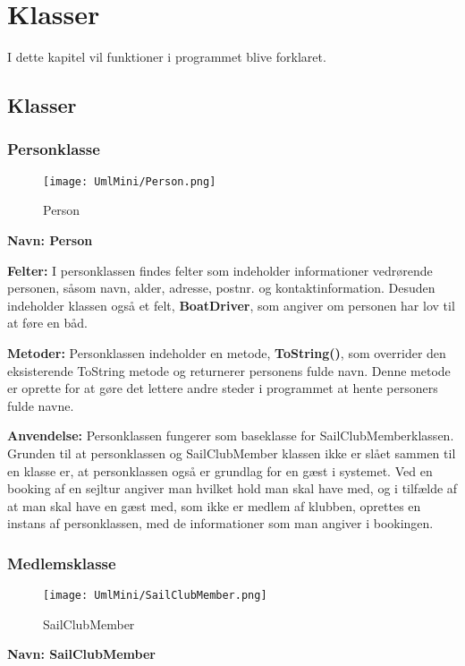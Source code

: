 \chapter{Klasser} \label{chap:klasser}
I dette kapitel vil funktioner i programmet blive forklaret.

\section{Klasser}
\subsection*{Personklasse}
\begin{wrapfigure}[9]{R}{0.25\textwidth}
    \label{img:Person}
    \vspace{-20pt}
    \begin{center}
        \texttt{[image: UmlMini/Person.png]}
    \end{center}
    \vspace{-10pt}
    \caption{Person}
\end{wrapfigure}
\textbf{Navn: Person}

\textbf{Felter:}
I personklassen findes felter som indeholder informationer vedrørende personen, såsom navn, alder, adresse, postnr. og kontaktinformation. 
Desuden indeholder klassen også et felt, \textbf{BoatDriver}, som angiver om personen har lov til at føre en båd. 

\textbf{Metoder:}
Personklassen indeholder en metode, \textbf{ToString()}, som overrider den eksisterende ToString metode og returnerer personens fulde navn. 
Denne metode er oprette for at gøre det lettere andre steder i programmet at hente personers fulde navne.

\textbf{Anvendelse:}
Personklassen fungerer som baseklasse for SailClubMemberklassen. Grunden til at personklassen og SailClubMember klassen ikke er slået sammen til en klasse er, at personklassen også er grundlag for en gæst i systemet. 
Ved en booking af en sejltur angiver man hvilket hold man skal have med, og i tilfælde af at man skal have en gæst med, som ikke er medlem af klubben, oprettes en instans af personklassen, med de informationer som man angiver i bookingen.

\subsection*{Medlemsklasse}
\begin{wrapfigure}[6]{R}{0.5\textwidth}
    \label{img:SailClubMember}
    \vspace{-30pt}
    \begin{center}
        \texttt{[image: UmlMini/SailClubMember.png]}
    \end{center}
    \vspace{-20pt}
    \caption{SailClubMember}
\end{wrapfigure}
\textbf{Navn: SailClubMember}

